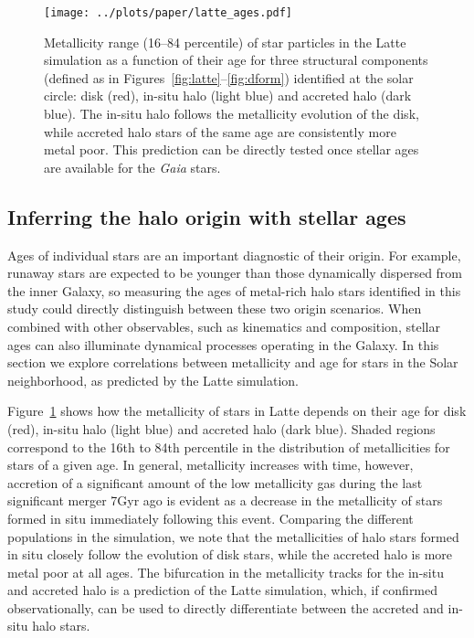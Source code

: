 \documentclass[apj, twocolappendix, numberedappendix, appendixfloats]{emulateapj}
\begin{document}
\begin{figure}
\begin{center}
\texttt{[image: ../plots/paper/latte\_ages.pdf]}
\caption{Metallicity range (16--84 percentile) of star particles in the Latte simulation as a function of their age for three structural components (defined as in Figures~\ref{fig:latte}--\ref{fig:dform}) identified at the solar circle: disk (red), in-situ halo (light blue) and accreted halo (dark blue).
The in-situ halo follows the metallicity evolution of the disk, while accreted halo stars of the same age are consistently more metal poor.
This prediction can be directly tested once stellar ages are available for the \emph{Gaia} stars.}
\label{fig:ages}
\end{center}
\end{figure}

\subsection{Inferring the halo origin with stellar ages}
\label{sec:ages}
Ages of individual stars are an important diagnostic of their origin.
For example, runaway stars are expected to be younger than those dynamically dispersed from the inner Galaxy, so measuring the ages of metal-rich halo stars identified in this study could directly distinguish between these two origin scenarios.
When combined with other observables, such as kinematics and composition, stellar ages can also illuminate dynamical processes operating in the Galaxy.
In this section we explore correlations between metallicity and age for stars in the Solar neighborhood, as predicted by the Latte simulation.

Figure~\ref{fig:ages} shows how the metallicity of stars in Latte depends on their age for disk (red), in-situ halo (light blue) and accreted halo (dark blue).
Shaded regions correspond to the 16th to 84th percentile in the distribution of metallicities for stars of a given age.
In general, metallicity increases with time, however, accretion of a significant amount of the low metallicity gas during the last significant merger 7\;Gyr ago is evident as a decrease in the metallicity of stars formed in situ immediately following this event.
Comparing the different populations in the simulation, we note that the metallicities of halo stars formed in situ closely follow the evolution of disk stars, while the accreted halo is more metal poor at all ages.
The bifurcation in the metallicity tracks for the in-situ and accreted halo is a prediction of the Latte simulation, which, if confirmed observationally, can be used to directly differentiate between the accreted and in-situ halo stars.
\end{document}
